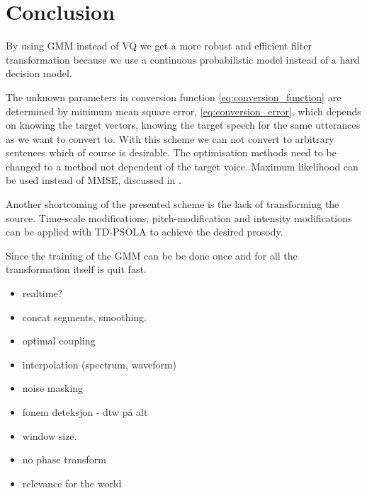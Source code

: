 \chapter{Conclusion} %
\label{cha:conclusion}
By using GMM instead of VQ we get a more robust and efficient filter transformation because we use a continuous probabilistic model instead of a hard decision model. 

The unknown parameters in conversion function \eqref{eq:conversion_function} are determined by minimum mean square error, \eqref{eq:conversion_error}, which depends on knowing the target vectors, \ie knowing the target speech for the same utterances as we want to convert to. With this scheme we can not convert to arbitrary sentences which of course is desirable. The optimisation methods need to be changed to a method not dependent of the target voice. Maximum likelihood can be used instead of MMSE, discussed in \cite{mouchtaris06,ye06}.

Another shortcoming of the presented scheme is the lack of transforming the source. Time-scale modifications, pitch-modification and intensity modifications can be applied with \eg TD-PSOLA to achieve the desired prosody.

Since the training of the GMM can be be done once and for all the transformation itself is quit fast. 



\begin{itemize}
	\item realtime?
	\item concat segments, smoothing.
	\item optimal coupling
	\item interpolation (spectrum, waveform)
	\item noise masking
	\item fonem deteksjon - dtw på alt
	\item window size.
	\item no phase transform
	\item relevance for the world
\end{itemize}











